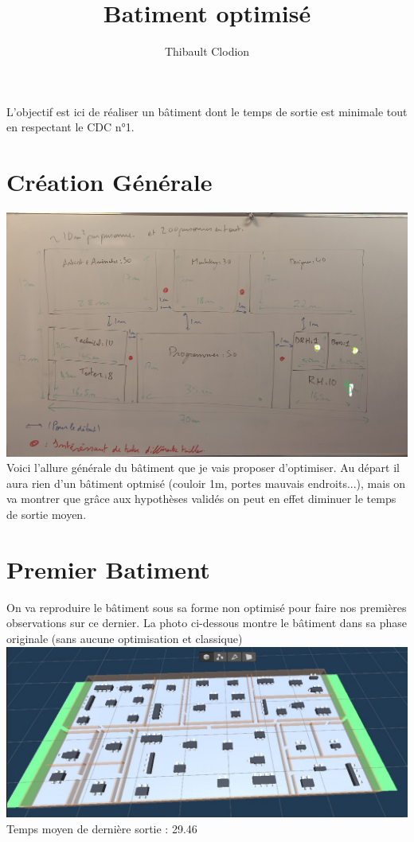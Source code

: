 \documentclass[12pt]{article}
\title{Batiment optimisé}
\author{Thibault Clodion}
\begin{document}
\maketitle %

L'objectif est ici de réaliser un bâtiment dont le temps de sortie est minimale tout en 
respectant le CDC n°1.

\section{Création Générale}

\includegraphics[scale=0.15]{Batiment optimisé croquis.jpg}
\newline\newline
Voici l'allure générale du bâtiment que je vais proposer d'optimiser.
\newline
Au départ il aura rien d'un bâtiment optmisé (couloir 1m, portes mauvais endroits...), mais 
on va montrer que grâce aux hypothèses validés on peut en effet diminuer le temps de sortie moyen.

\section{Premier Batiment}
On va reproduire le bâtiment sous sa forme non optimisé pour faire nos premières observations sur ce dernier.
\newline\newline
La photo ci-dessous montre le bâtiment dans sa phase originale (sans aucune optimisation et classique)
\newline
\includegraphics[scale=0.5]{Batiment initial.jpg}
\newline\newline
Temps moyen de dernière sortie : 29.46
\end{document}
